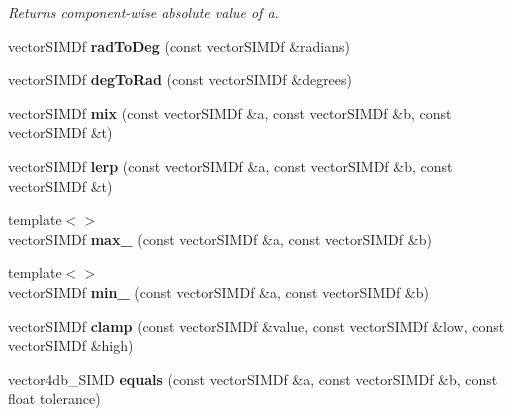 \begin{DoxyCompactItemize}
\begin{DoxyCompactList}\small\item\em Returns component-\/wise absolute value of a. \end{DoxyCompactList}\item 
vector\+S\+I\+M\+Df {\bfseries rad\+To\+Deg} (const vector\+S\+I\+M\+Df \&radians)\hypertarget{namespaceirr_a066c66f19bdf0a8a5383d6f2c8fc0045}{}\label{namespaceirr_a066c66f19bdf0a8a5383d6f2c8fc0045}

\item 
vector\+S\+I\+M\+Df {\bfseries deg\+To\+Rad} (const vector\+S\+I\+M\+Df \&degrees)\hypertarget{namespaceirr_a4bedbe1338ca1e87d983c69f2df71fcd}{}\label{namespaceirr_a4bedbe1338ca1e87d983c69f2df71fcd}

\item 
vector\+S\+I\+M\+Df {\bfseries mix} (const vector\+S\+I\+M\+Df \&a, const vector\+S\+I\+M\+Df \&b, const vector\+S\+I\+M\+Df \&t)\hypertarget{namespaceirr_ae00f4a79d17e9736ab0c23aac565bbe0}{}\label{namespaceirr_ae00f4a79d17e9736ab0c23aac565bbe0}

\item 
vector\+S\+I\+M\+Df {\bfseries lerp} (const vector\+S\+I\+M\+Df \&a, const vector\+S\+I\+M\+Df \&b, const vector\+S\+I\+M\+Df \&t)\hypertarget{namespaceirr_a0b772bbfb1de86d50e908d20fe023c26}{}\label{namespaceirr_a0b772bbfb1de86d50e908d20fe023c26}

\item 
{\footnotesize template$<$$>$ }\\vector\+S\+I\+M\+Df {\bfseries max\+\_\+} (const vector\+S\+I\+M\+Df \&a, const vector\+S\+I\+M\+Df \&b)\hypertarget{namespaceirr_ada12ad51c343c2702bbcbe5ae39e2675}{}\label{namespaceirr_ada12ad51c343c2702bbcbe5ae39e2675}

\item 
{\footnotesize template$<$$>$ }\\vector\+S\+I\+M\+Df {\bfseries min\+\_\+} (const vector\+S\+I\+M\+Df \&a, const vector\+S\+I\+M\+Df \&b)\hypertarget{namespaceirr_aa94a773f770122d6d68f900a41a337ac}{}\label{namespaceirr_aa94a773f770122d6d68f900a41a337ac}

\item 
vector\+S\+I\+M\+Df {\bfseries clamp} (const vector\+S\+I\+M\+Df \&value, const vector\+S\+I\+M\+Df \&low, const vector\+S\+I\+M\+Df \&high)\hypertarget{namespaceirr_a9fc9bc39e5f647794c69693516ba0217}{}\label{namespaceirr_a9fc9bc39e5f647794c69693516ba0217}

\item 
vector4db\+\_\+\+S\+I\+MD {\bfseries equals} (const vector\+S\+I\+M\+Df \&a, const vector\+S\+I\+M\+Df \&b, const float tolerance)\hypertarget{namespaceirr_a632255cba1677a5414f9dbd8f34b7ce6}{}\label{namespaceirr_a632255cba1677a5414f9dbd8f34b7ce6}


\end{DoxyCompactItemize}
